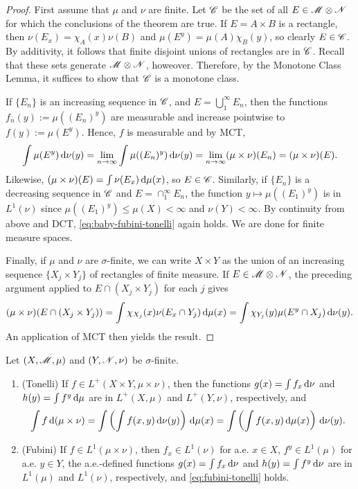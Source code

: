 \documentclass[12pt]{article} %
\begin{document}
\begin{proof}
    First assume that $\mu$ and $\nu$ are finite. Let $\mathscr{C}$ be the set of all $E \in \mathscr{M} \otimes \mathscr{N}$ for which the conclusions of the theorem are true. If $E = A \times B$ is a rectangle, then $\nu(E_x) = \chi_A(x) \nu(B)$ and $\mu(E^y) = \mu(A) \chi_B(y)$, so clearly $E \in \mathscr{C}$. By additivity, it follows that finite disjoint unions of rectangles are in $\mathscr{C}$. Recall that these sets generate $\mathscr{M} \otimes \mathscr{N}$, howeover. Therefore, by the Monotone Class Lemma, it suffices to show that $\mathscr{C}$ is a monotone class.

    If $\{E_n\}$ is an increasing sequence in $\mathscr{C}$, and $E = \bigcup_1^\infty E_n$, then the functions $f_n(y) := \mu((E_n)^y)$ are measurable and increase pointwise to $f(y) := \mu(E^y)$. Hence, $f$ is measurable and by MCT, \begin{align}\label{eq:baby-fubini-tonelli}
        \int \mu(E^y) \, \mathrm{d} \nu(y) = \lim_{n \to \infty} \int \mu((E_n)^y) \, \mathrm{d} \nu(y) = \lim_{n \to \infty} (\mu \times \nu)(E_n) = (\mu \times \nu)(E).
    \end{align}Likewise, $(\mu \times \nu)(E) = \int \nu(E_x) \, \mathrm{d} \mu(x)$, so $E \in \mathscr{C}$. Similarly, if $\{E_n\}$ is a decreasing sequence in $\mathscr{C}$ and $E = \cap_1^\infty E_n$, the function $y \mapsto \mu((E_1)^y)$ is in $L^1(\nu)$ since $\mu((E_1)^y) \leq \mu(X) < \infty$ and $\nu(Y) < \infty$. By continuity from above and DCT, \cref{eq:baby-fubini-tonelli} again holds. We are done for finite measure spaces.

    Finally, if $\mu$ and $\nu$ are $\sigma$-finite, we can write $X \times Y$ as the union of an increasing sequence $\{X_j \times Y_j\}$ of rectangles of finite measure. If $E \in \mathscr{M} \otimes \mathscr{N}$, the preceding argument applied to $E \cap (X_j \times Y_j)$ for each $j$ gives \[(\mu \times \nu)(E \cap (X_j \times Y_j)) = \int \chi_{X_j}(x)\nu(E_x \cap Y_j) \, \mathrm{d} \mu(x) = \int \chi_{Y_j} (y) \mu (E^y \cap X_j) \, \mathrm{d} \nu(y).\] An application of MCT then yields the result.
\end{proof}

\begin{theorem}
    Let $(X, \mathscr{M}, \mu)$ and $(Y, \mathscr{N}, \nu)$ be $\sigma$-finite. \begin{enumerate}
        \item (Tonelli) If $f \in L^+(X \times Y, \mu \times \nu)$, then the functions $g(x) = \int f_x \, \mathrm{d} \nu$ and $h(y) = \int f^y \, \mathrm{d} \mu$ are in $L^+(X, \mu)$ and $L^+(Y, \nu)$, respectively, and \begin{align}\label{eq:fubini-tonelli}
            \int f \, \mathrm{d}(\mu \times \nu) = \int \left( \int f(x,y) \, \mathrm{d} \nu(y) \right) \, \mathrm{d} \mu(x) = \int \left( \int f(x, y) \, \mathrm{d} \mu(x) \right) \, \mathrm{d} \nu(y).
        \end{align}
        \item (Fubini) If $f \in L^1(\mu \times \nu)$, then $f_x \in L^1(\nu)$ for a.e. $x \in X$, $f^y \in L^1(\mu)$ for a.e. $y \in Y$, the a.e.-defined functions $g(x) = \int f_x \, \mathrm{d} \nu$ and $h(y) = \int f^y \, \mathrm{d} \nu$ are in $L^1(\mu)$ and $L^1(\nu)$, respectively, and \cref{eq:fubini-tonelli} holds.
    \end{enumerate}
\end{theorem}
\end{document}
